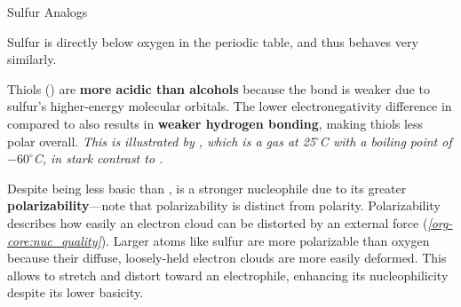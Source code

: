 \documentclass[10pt]{article}
\begin{document}
  \begin{core}{Sulfur Analogs}
    
    Sulfur is directly below oxygen in the periodic table, and thus behaves very similarly.

    Thiols () are \textbf{more acidic than alcohols} because the  bond is weaker due to sulfur's higher-energy molecular orbitals. The lower electronegativity difference in  compared to  also results in \textbf{weaker hydrogen bonding}, making thiols less polar overall. \textit{This is illustrated by , which is a gas at 25$^\circ$C with a boiling point of $-60^\circ$C, in stark contrast to .} 

    Despite being less basic than ,  is a stronger nucleophile due to its greater \textbf{polarizability}---note that polarizability is distinct from polarity. Polarizability describes how easily an electron cloud can be distorted by an external force (\textit{\autoref{org-core:nuc_quality}}). Larger atoms like sulfur are more polarizable than oxygen because their diffuse, loosely-held electron clouds are more easily deformed. This allows  to stretch and distort toward an electrophile, enhancing its nucleophilicity despite its lower basicity.

  \end{core} 
\end{document}
